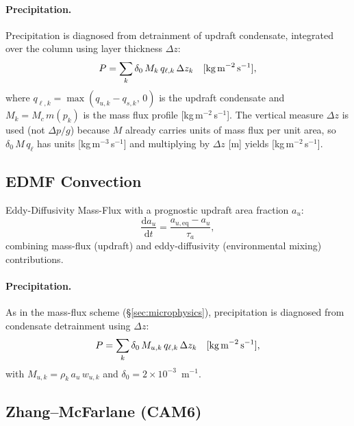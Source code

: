 \documentclass[11pt,twoside]{report}
\newcommand{\dd}{\mathrm{d}}
\begin{document}
\paragraph{Precipitation.}
Precipitation is diagnosed from detrainment of updraft condensate,
integrated over the column using layer thickness $\Delta z$:
\begin{equation}
  P = \sum_k \delta_0\,M_k\,q_{\ell,k}\,\Delta z_k
  \quad [\text{kg\,m}^{-2}\,\text{s}^{-1}],
\end{equation}
where $q_{\ell,k}=\max(q_{u,k}-q_{s,k},\,0)$ is the updraft condensate
and $M_k=M_c\,m(p_k)$ is the mass flux profile [kg\,m$^{-2}$\,s$^{-1}$].
The vertical measure $\Delta z$ is used (not $\Delta p/g$) because $M$
already carries units of mass flux per unit area, so $\delta_0\,M\,q_\ell$
has units [kg\,m$^{-3}$\,s$^{-1}$] and multiplying by $\Delta z$ [m]
yields [kg\,m$^{-2}$\,s$^{-1}$].

\subsection{EDMF Convection}

Eddy-Diffusivity Mass-Flux with a prognostic updraft area fraction $a_u$:
\begin{equation}
  \frac{\dd a_u}{\dd t} = \frac{a_{u,\mathrm{eq}}-a_u}{\tau_a},
\end{equation}
combining mass-flux (updraft) and eddy-diffusivity (environmental mixing)
contributions.

\paragraph{Precipitation.}
As in the mass-flux scheme (\S\ref{sec:microphysics}), precipitation
is diagnosed from condensate detrainment using $\Delta z$:
\begin{equation}
  P = \sum_k \delta_0\,M_{u,k}\,q_{\ell,k}\,\Delta z_k
  \quad [\text{kg\,m}^{-2}\,\text{s}^{-1}],
\end{equation}
with $M_{u,k}=\rho_k\,a_u\,w_{u,k}$ and $\delta_0=2\times10^{-3}$~m$^{-1}$.

\subsection{Zhang--McFarlane (CAM6)}
\label{sec:zm-cam6}
\end{document}
